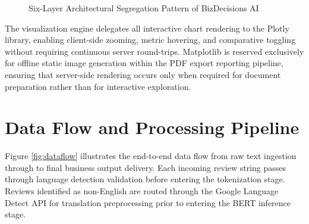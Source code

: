\documentclass[12pt,a4paper]{report}
\begin{document}
\begin{figure}[H]
\centering
{}
\caption{Six-Layer Architectural Segregation Pattern of BizDecisions AI}
\label{fig:architecture}
\end{figure}

The visualization engine delegates all interactive chart rendering to the Plotly library, enabling client-side zooming, metric hovering, and comparative toggling without requiring continuous server round-trips. Matplotlib is reserved exclusively for offline static image generation within the PDF export reporting pipeline, ensuring that server-side rendering occurs only when required for document preparation rather than for interactive exploration.

\section{Data Flow and Processing Pipeline}

Figure \ref{fig:dataflow} illustrates the end-to-end data flow from raw text ingestion through to final business output delivery. Each incoming review string passes through language detection validation before entering the tokenization stage. Reviews identified as non-English are routed through the Google Language Detect API for translation preprocessing prior to entering the BERT inference stage.
\end{document}

